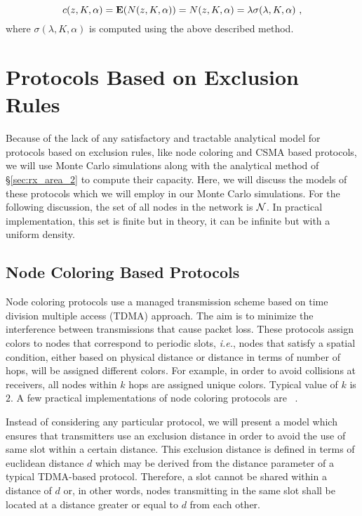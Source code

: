 \documentclass[12pt,english]{article}
\begin{document}
$$
c(z,K,\alpha)={\bf E}(N(z,K,\alpha))=N(z,K,\alpha)=\lambda\sigma(\lambda,K,\alpha)~,
$$ 
where $\sigma(\lambda,K,\alpha)$ is computed using the above described method. 

\section{Protocols Based on Exclusion Rules}
\label{sec:practical}

Because of the lack of any satisfactory and tractable analytical model for protocols based on exclusion rules, like node coloring and CSMA based protocols, we will use Monte Carlo simulations along with the analytical method of \S \ref{sec:rx_area_2} to compute their capacity. Here, we will discuss the models of these protocols which we will employ in our Monte Carlo simulations. For the following discussion, the set of all nodes in the network is ${\cal N}$. In practical implementation, this set is finite but in theory, it can be infinite but with a uniform density.

\subsection{Node Coloring Based Protocols}
\label{sec:tdma}

Node coloring protocols use a managed transmission scheme based on time division multiple access (TDMA) approach. The aim is to minimize the interference between transmissions that cause packet loss. These protocols assign colors to nodes that correspond to periodic slots, {\it i.e.}, nodes that satisfy a spatial condition, either based on physical distance or distance in terms of number of hops, will be assigned different colors. For example, in order to avoid collisions at receivers, all nodes within $k$ hops are assigned unique colors. Typical value of $k$  is $2$. A few practical implementations of node coloring protocols are ~\cite{unified,NAMA,SEEDEX,FPRP,DRAND}. 

Instead of considering any particular protocol, we will present a model which ensures that transmitters use an exclusion distance in order to avoid the use of same slot within a certain distance. This exclusion distance is defined in terms of euclidean distance $d$ which may be derived from the distance parameter of a typical TDMA-based protocol. Therefore, a slot cannot be shared within a distance of $d$ or, in other words, nodes transmitting in the same slot shall be located at a distance greater or equal to $d$ from each other. 
\end{document}
